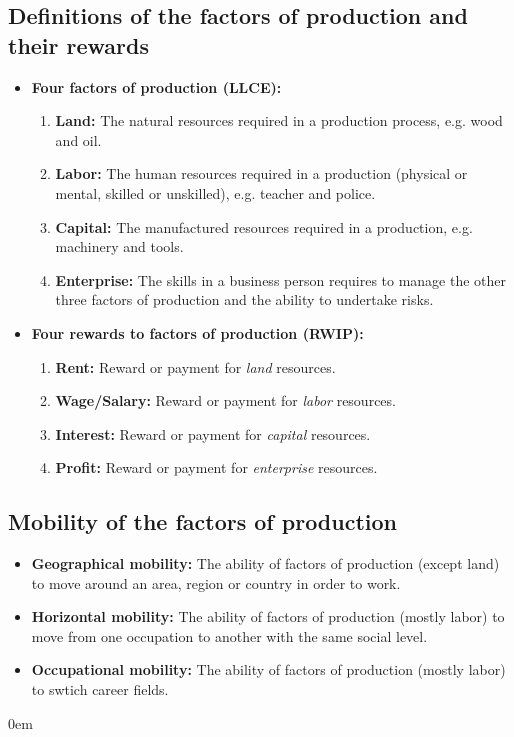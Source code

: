 \documentclass[11pt, a4paper, openany]{book}
\begin{document}
\subsection{Definitions of the factors of production and their rewards}

\begin{itemize}\itemsep0em
    \item \textbf{Four factors of production (LLCE):}
        \begin{enumerate}\itemsep0em
            \item \textbf{Land:} The natural resources required in a production process, e.g. wood and oil.
            \item \textbf{Labor:} The human resources required in a production (physical or mental, skilled or unskilled), e.g. teacher and police.
            \item \textbf{Capital:} The manufactured resources required in a production, e.g. machinery and tools.
            \item \textbf{Enterprise:} The skills in a business person requires to manage the other three factors of production and the ability to undertake risks.
        \end{enumerate}
    \item \textbf{Four rewards to factors of production (RWIP):}
        \begin{enumerate}\itemsep0em
            \item \textbf{Rent:} Reward or payment for \textit{land} resources.
            \item \textbf{Wage/Salary:} Reward or payment for \textit{labor} resources.
            \item \textbf{Interest:} Reward or payment for \textit{capital} resources.
            \item \textbf{Profit:} Reward or payment for \textit{enterprise} resources.
        \end{enumerate}
\end{itemize}

\subsection{Mobility of the factors of production}

\begin{itemize}\itemsep0em
    \item \textbf{Geographical mobility:} The ability of factors of production (except land) to move around an area, region or country in order to work.
    \item \textbf{Horizontal mobility:} The ability of factors of production (mostly labor) to move from one occupation to another with the same social level.
    \item \textbf{Occupational mobility:} The ability of factors of production (mostly labor) to swtich career fields.
\end{itemize}\itemsep0em
\end{document}
